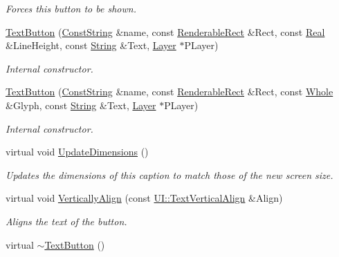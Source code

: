 \begin{DoxyCompactItemize}
\begin{DoxyCompactList}\small\item\em Forces this button to be shown. \item\end{DoxyCompactList}\item 
\hyperlink{classMezzanine_1_1UI_1_1TextButton_afe8633509682d805d21b388bb25441b9}{TextButton} (\hyperlink{namespaceMezzanine_a63cd699ac54b73953f35ec9cfc05e506}{ConstString} \&name, const \hyperlink{structMezzanine_1_1UI_1_1RenderableRect}{RenderableRect} \&Rect, const \hyperlink{namespaceMezzanine_a726731b1a7df72bf3583e4a97282c6f6}{Real} \&LineHeight, const \hyperlink{namespaceMezzanine_acf9fcc130e6ebf08e3d8491aebcf1c86}{String} \&Text, \hyperlink{classMezzanine_1_1UI_1_1Layer}{Layer} $\ast$PLayer)
\begin{DoxyCompactList}\small\item\em Internal constructor. \item\end{DoxyCompactList}\item 
\hyperlink{classMezzanine_1_1UI_1_1TextButton_af4fe4056a7c4c2714638165a24b5a706}{TextButton} (\hyperlink{namespaceMezzanine_a63cd699ac54b73953f35ec9cfc05e506}{ConstString} \&name, const \hyperlink{structMezzanine_1_1UI_1_1RenderableRect}{RenderableRect} \&Rect, const \hyperlink{namespaceMezzanine_adcbb6ce6d1eb4379d109e51171e2e493}{Whole} \&Glyph, const \hyperlink{namespaceMezzanine_acf9fcc130e6ebf08e3d8491aebcf1c86}{String} \&Text, \hyperlink{classMezzanine_1_1UI_1_1Layer}{Layer} $\ast$PLayer)
\begin{DoxyCompactList}\small\item\em Internal constructor. \item\end{DoxyCompactList}\item 
virtual void \hyperlink{classMezzanine_1_1UI_1_1TextButton_a06a5a6400dff268de5c91737de09fda9}{UpdateDimensions} ()
\begin{DoxyCompactList}\small\item\em Updates the dimensions of this caption to match those of the new screen size. \item\end{DoxyCompactList}\item 
virtual void \hyperlink{classMezzanine_1_1UI_1_1TextButton_aa3f101b72211c2296c0709c183edc6db}{VerticallyAlign} (const \hyperlink{namespaceMezzanine_1_1UI_ab35e3845e2541698245262cc17147ae9}{UI::TextVerticalAlign} \&Align)
\begin{DoxyCompactList}\small\item\em Aligns the text of the button. \item\end{DoxyCompactList}\item 
\hypertarget{classMezzanine_1_1UI_1_1TextButton_a25c5727451d8dac8919c098b030c5bb8}{
virtual \hyperlink{classMezzanine_1_1UI_1_1TextButton_a25c5727451d8dac8919c098b030c5bb8}{$\sim$TextButton} ()}
\label{classMezzanine_1_1UI_1_1TextButton_a25c5727451d8dac8919c098b030c5bb8}


\end{DoxyCompactItemize}
